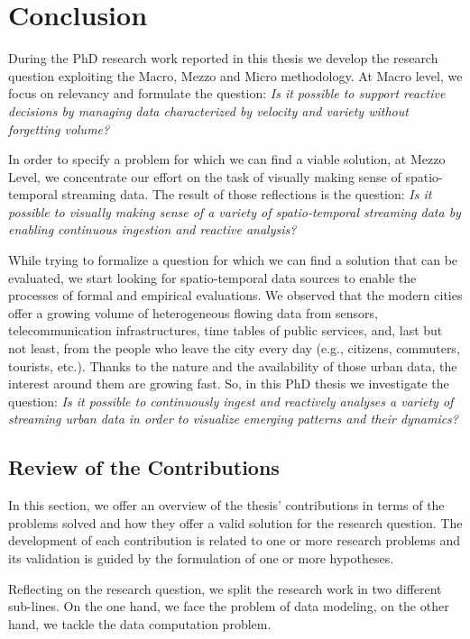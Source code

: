 \chapter{Conclusion}\label{ch:conclusion}

During the PhD research work reported in this thesis we develop the research question exploiting the Macro, Mezzo and Micro methodology.
At Macro level, we focus on relevancy and formulate the question: \textit{Is it possible to support reactive decisions by managing data characterized by velocity and variety without forgetting volume?}

In order to specify a problem for which we can find a viable solution, at Mezzo Level, we concentrate our effort on the task of visually making sense of spatio-temporal streaming data. The result of those reflections is the question: \textit{Is it possible to visually making sense of a variety of spatio-temporal streaming data by enabling continuous ingestion and reactive analysis?}

While trying to formalize a question for which we can find a solution that can be evaluated, we start looking for spatio-temporal data sources to enable the processes of formal and empirical evaluations.
We observed that the modern cities offer a growing volume of heterogeneous flowing data from sensors, telecommunication infrastructures, time tables of public services, and, last but not least, from the people who leave the city every day (e.g., citizens, commuters, tourists, etc.).
Thanks to the nature and the availability of those urban data, the interest around them are growing fast.
So, in this PhD thesis we investigate the question: \textit{Is it possible to continuously ingest and reactively analyses a variety of streaming urban data in order to visualize emerging patterns and their dynamics?}

\section{Review of the Contributions}

In this section, we offer an overview of the thesis' contributions in terms of the problems solved and how they offer a valid solution for the research question.
The development of each contribution is related to one or more research problems and its validation is guided by the formulation of one or more hypotheses.

Reflecting on the research question, we split the research work in two different sub-lines.
On the one hand, we face the problem of data modeling, on the other hand, we tackle the data computation problem.

